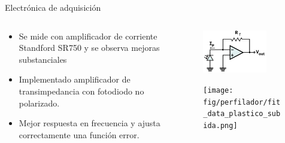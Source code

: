 
\begin{frame}{Electrónica de adquisición}
\begin{columns}[c]
    \begin{column}{0.5\textwidth}
        \begin{itemize}
        \item Se mide con amplificador de corriente Standford SR750 y se observa mejoras substanciales
        \item Implementado amplificador de transimpedancia con fotodiodo no polarizado. 
        \item Mejor respuesta en frecuencia y ajusta correctamente una función error.
        \end{itemize}
    \end{column}
    \begin{column}{0.4\textwidth}
        
        \vspace{-1em}
        \begin{figure}[H]
            \centering
            \includegraphics[width=0.8\textwidth]{fig/circuito/amp/TIA.png}
            \label{fig:circuito/amp/TIA}
        \end{figure}
        \vspace{-1em}
         \begin{figure}[H]
                \texttt{[image: fig/perfilador/fit\_data\_plastico\_subida.png]}
                \label{fig:perfilador/amplificacion_funcional}
        \end{figure}
    \end{column}
\end{columns}



\end{frame}

